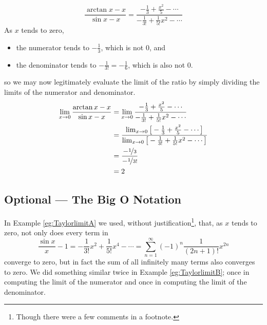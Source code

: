 \begin{eg}
\begin{equation*}
\frac{\arctan x -x}{\sin x - x}
= \frac{-\frac{1}{3}+\frac{x^2}{5}-\cdots}
       {-\frac{1}{3!}+\frac{1}{5!}x^2 - \cdots}
\end{equation*}
As $x$ tends to zero,
\begin{itemize}
\item the numerator tends to $-\frac{1}{3}$, which is not $0$, and
\item the denominator tends to $-\frac{1}{3!}=-\frac{1}{6}$,
which is also not $0$.
\end{itemize}
so we may now legitimately evaluate the limit of the ratio by
simply dividing the limits of the numerator and denominator.
\begin{align*}
\lim_{x\rightarrow 0}\frac{\arctan x -x}{\sin x-x}
&=\lim_{x\rightarrow 0} \frac{-\frac{1}{3}+\frac{x^2}{5}-\cdots}
       {-\frac{1}{3!}+\frac{1}{5!}x^2 - \cdots} \\
&=\frac{\lim_{x\rightarrow 0} \big[-\frac{1}{3}+\frac{x^2}{5}-\cdots\big]}
       {\lim_{x\rightarrow 0} \big[-\frac{1}{3!}+\frac{1}{5!}x^2 - \cdots\big]}
\\
&=\frac{-\nicefrac{1}{3}}{-\nicefrac{1}{3!}} \\
&=2
\end{align*}
\end{eg}


\subsection{Optional --- The Big O Notation}

In Example \ref{eg:TaylorlimitA} we used, without justification\footnote{Though there were a few comments in a
footnote.}, that, as $x$ tends to zero, not only does every term in
\begin{equation*}
\frac{\sin x}{x}-1
= -\frac{1}{3!}x^2 + \frac{1}{5!}x^4 - \cdots
=\sum_{n=1}^\infty (-1)^n\frac{1}{(2n+1)!}x^{2n}
\end{equation*}
converge to zero, but in fact the sum of all infinitely many
terms also converges to zero. We did something similar twice in
Example \ref{eg:TaylorlimitB}; once in computing the limit of
the numerator and once in computing the limit of the denominator.



